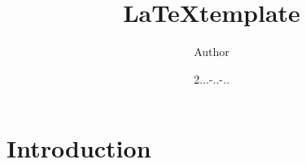 \documentclass[letterpaper,11pt]{article}
\title{\LaTeX template}
\author{Author}
\date{2...-..-..}
\newcommand{\myLink}[2]{\href{#1}{\color{blue}\underline{\smash{\texttt{#2}}}}}
\begin{document}
\maketitle

\section{Introduction}



%
%
%
%
%
%
%
\end{document}
